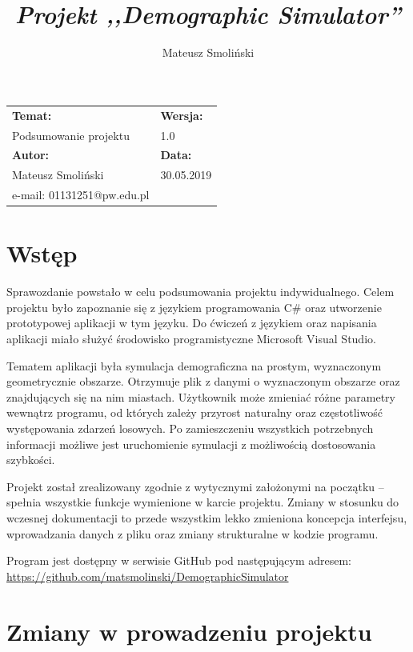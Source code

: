 \documentclass[a4paper,12pt]{article}
\title{ \sc{Sprawozdanie} \\
\emph{Projekt ,,Demographic Simulator''} }
\author{Mateusz Smoliński}
\newcommand\tab[1][0.6cm]{\hspace*{#1} }
\begin{document}
\maketitle

\thispagestyle{empty}

\begin{tabu} to 0.9\textwidth{ |X[c]|X[c]| } 
 \hline
 \textbf{Temat:} & \textbf{Wersja:} \\ 
 Podsumowanie projektu & 1.0 \\ 
 \hline
 \textbf{Autor:} & \textbf{Data:} \\ 
 Mateusz Smoliński & 30.05.2019 \\
 e-mail: 01131251@pw.edu.pl & \\
 \hline
\end{tabu}


\tableofcontents

\newpage

\section{Wstęp}


\tab Sprawozdanie powstało w celu podsumowania projektu indywidualnego. Celem projektu było zapoznanie się z językiem programowania C\# oraz utworzenie prototypowej aplikacji w tym języku. Do ćwiczeń z językiem oraz napisania aplikacji miało służyć środowisko programistyczne Microsoft Visual Studio.

Tematem aplikacji była symulacja demograficzna na prostym, wyznaczonym geometrycznie obszarze. Otrzymuje plik z danymi o wyznaczonym obszarze oraz znajdujących się na nim miastach. Użytkownik może zmieniać różne parametry wewnątrz programu, od których zależy przyrost naturalny oraz częstotliwość występowania zdarzeń losowych. Po zamieszczeniu wszystkich potrzebnych informacji możliwe jest uruchomienie symulacji z możliwością dostosowania szybkości. 

Projekt został zrealizowany zgodnie z wytycznymi założonymi na początku -- spełnia wszystkie funkcje wymienione w karcie projektu. Zmiany w stosunku do wczesnej dokumentacji to przede wszystkim lekko zmieniona koncepcja interfejsu, wprowadzania danych z pliku oraz zmiany strukturalne w kodzie programu.

Program jest dostępny w serwisie GitHub pod następującym adresem:
\url{https://github.com/matsmolinski/DemographicSimulator}



\section{Zmiany w prowadzeniu projektu}
\end{document}
